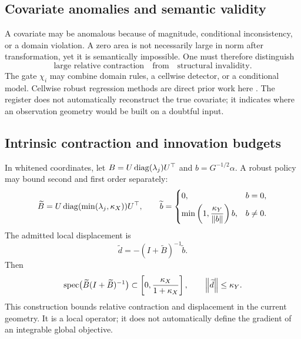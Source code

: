 \subsection{Covariate anomalies and semantic validity}
A covariate may be anomalous because of magnitude, conditional inconsistency, or a domain violation. A zero area is not necessarily large in norm after transformation, yet it is semantically impossible. One must therefore distinguish
\[
\text{large relative contraction}
\quad\text{from}\quad
\text{structural invalidity}.
\]
The gate $\chi_i$ may combine domain rules, a cellwise detector, or a conditional model. Cellwise robust regression methods are direct prior work here \citep{filzmoser2020}. The register does not automatically reconstruct the true covariate; it indicates where an observation geometry would be built on a doubtful input.

\subsection{Intrinsic contraction and innovation budgets}
In whitened coordinates, let $B=U\operatorname{diag}(\lambda_j)U^\top$ and $b=G^{-1/2}\alpha$. A robust policy may bound second and first order separately:
\begin{equation}
\widetilde B
=U\operatorname{diag}(\min(\lambda_j,\kappa_X))U^\top,
\qquad
\widetilde b
=
\begin{cases}
0,& b=0,\\[1mm]
\displaystyle \min\left(1,\frac{\kappa_Y}{\left\lVert b\right\rVert}\right)b,& b\neq0.
\end{cases}
\label{eq:intrinsic-clipping}
\end{equation}
The admitted local displacement is
\begin{equation}
\widetilde d=-(I+\widetilde B)^{-1}\widetilde b.
\end{equation}
Then
\[
\operatorname{spec}\bigl(\widetilde B(I+\widetilde B)^{-1}\bigr)
\subset\left[0,\frac{\kappa_X}{1+\kappa_X}\right],
\qquad
\left\lVert \widetilde d\right\rVert\leq\kappa_Y.
\]
This construction bounds relative contraction and displacement in the current geometry. It is a local operator; it does not automatically define the gradient of an integrable global objective.

